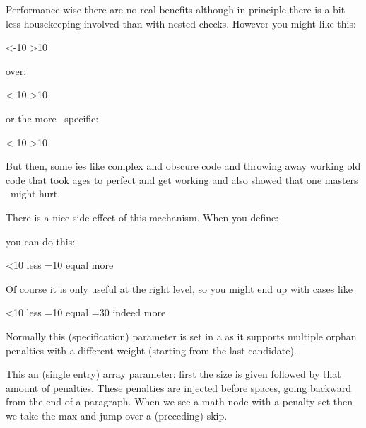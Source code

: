 Performance wise there are no real benefits although in principle there is a bit
less housekeeping involved than with nested checks. However you might like this:

\starttyping
\ifnum\scratchcounter<-10
    \expandafter\toosmall
\orelse\ifnum\scratchcounter>10
    \expandafter\toolarge
\else
    \expandafter\justright
\fi
\stoptyping

over:

\starttyping
\ifnum\scratchcounter<-10
    \expandafter\toosmall
\else\ifnum\scratchcounter>10
    \expandafter\expandafter\expandafter\toolarge
\else
    \expandafter\expandafter\expandafter\justright
\fi\fi
\stoptyping

or the more \CONTEXT\ specific:

\starttyping
\ifnum\scratchcounter<-10
    \expandafter\toosmall
\else\ifnum\scratchcounter>10
    \doubleexpandafter\toolarge
\else
    \doubleexpandafter\justright
\fi\fi
\stoptyping

But then, some \TEX ies like complex and obscure code and throwing away working
old code that took ages to perfect and get working and also showed that one
masters \TEX\ might hurt.

There is a nice side effect of this mechanism. When you define:

\starttyping
\def\quitcondition{\orelse\iffalse}
\stoptyping

you can do this:

\starttyping
\ifnum{}<10
    less
\orelse\ifnum{}=10
    equal
    \quitcondition
    indeed
\else
    more
\fi
\stoptyping

Of course it is only useful at the right level, so you might end up with cases like

\starttyping
\ifnum{}<10
    less
\orelse\ifnum{}=10
    equal
    \ifnum{}=30
        \expandafter\quitcondition
    \fi
    indeed
\else
    more
\fi
\stoptyping

\stopnewprimitive

\startnewprimitive[title={\prm {orphanlinefactors}}]

Normally this (specification) parameter is set in a  as it
supports multiple orphan penalties with a different weight (starting from the
last candidate).

\stopnewprimitive

\startnewprimitive[title={\prm {orphanpenalties}}]

This an (single entry) array parameter: first the size is given followed by that
amount of penalties. These penalties are injected before spaces, going backward
from the end of a paragraph. When we see a math node with a penalty set then we
take the max and jump over a (preceding) skip.

